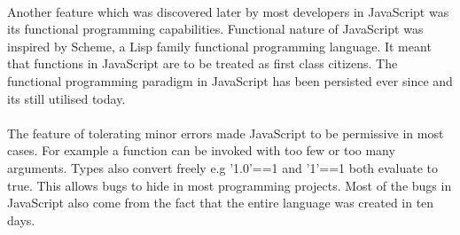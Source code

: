 \paragraph{}
Another feature which was discovered later by most developers in JavaScript was its functional programming capabilities\cite{JS}. Functional nature of JavaScript was inspired by Scheme, a Lisp family functional programming language. It meant that functions in JavaScript are to be treated as first  class citizens. The functional programming paradigm in JavaScript has been persisted  ever since and its still utilised today\cite{JS}.
\paragraph{}
The feature of tolerating minor errors made JavaScript to be permissive in most cases. For example a function can be invoked with too few or too many arguments. Types also convert freely e.g '1.0'==1 and '1'==1 both evaluate to true\cite{Eich:2005:JTY:1090189.1086382}. This allows bugs to hide in most programming projects. Most of the bugs in JavaScript also come from the fact that the entire language was created in ten days.